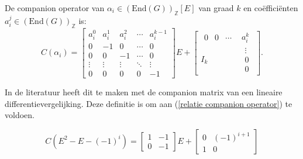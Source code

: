 \documentclass[a4paper,12pt]{article}
\begin{document}
\begin{definition}
    De companion operator van  $\alpha_i \in (\text{End}(G))_\mathbb{Z}[E]$ van graad $k$ en
    coëfficiënten $a^j_i \in(\text{End}(G))_\mathbb{Z} $ is:
    $$
        C(\alpha_i) =
        \left[\begin{array}{ccccc}
                a_i^0  & a_i^1  & a_i^2  & \cdots & a_i^{k-1} \\
                0      & -1     & 0      & \cdots & 0         \\
                0      & 0      & -1     & \cdots & 0         \\
                \vdots & \vdots & \vdots & \ddots & \vdots    \\
                0      & 0      & 0      & 0      & -1
            \end{array}\right]E +
        \left[
            \begin{array}{cc}
                \begin{array}{ccc}
                    0 & 0 & \cdots
                \end{array} & a_{i}^{k}              \\
                I_k                & \begin{array}{c}
                                         \vdots \\
                                         0      \\
                                         0
                                     \end{array}
            \end{array} \right].
    $$

\end{definition}

\begin{remark}
    In de literatuur heeft dit te maken met de companion matrix van een lineaire differentievergelijking. Deze definitie is
    om aan (\ref{relatie companion operator}) te voldoen.
\end{remark}

\begin{example}
    $$
        C(E^2-E-(-1)^i) = \left[
            \begin{array}{cc}
                1 & -1 \\
                0 & -1
            \end{array}
            \right] E +
        \left[
            \begin{array}{cc}
                0 & (-1)^{i+1} \\
                1 & 0
            \end{array}
            \right]
    $$
\end{example}
\end{document}
